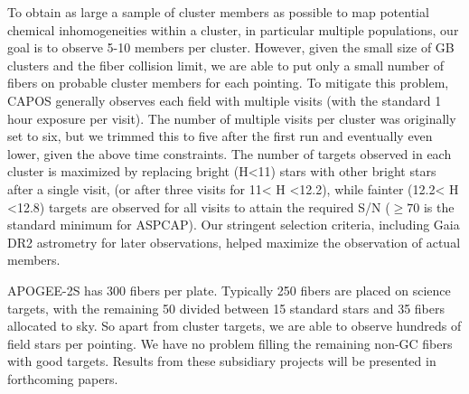 \documentclass[onecolumn]{aa}
\begin{document}
To obtain as large a sample of cluster members as possible to map potential chemical inhomogeneities within a cluster, in particular multiple populations, our goal is to observe 5-10 members per cluster. However, 
given the small size of
GB clusters  and the fiber collision
limit, we are able to put only a small number of fibers on probable cluster members for each pointing.
To mitigate this problem, CAPOS generally observes each field with multiple
visits (with the standard 1 hour exposure per visit). The number of multiple visits per cluster was originally set to six, but we trimmed this to five after the first run and eventually even lower, given the above time constraints.
The number of targets observed in each cluster is
maximized by replacing bright (H<11) stars with other bright stars after a single visit, (or after three
visits for 11< H <12.2), while fainter (12.2< H <12.8) targets are observed for all visits to attain
the required S/N ($\ge 70$ is the standard minimum for ASPCAP).  Our stringent selection criteria, including Gaia DR2 astrometry for later observations, helped maximize the observation of actual members. 

APOGEE-2S has 300 fibers per plate. %
Typically 250 fibers are placed
on science targets, with the remaining 50 divided between 15 standard stars and 35 fibers allocated
to sky. So apart from cluster targets, we are able to observe hundreds of field stars per pointing.
We have no problem filling the remaining non-GC fibers with good targets. Results from these subsidiary projects will be presented in forthcoming papers.
\end{document}
